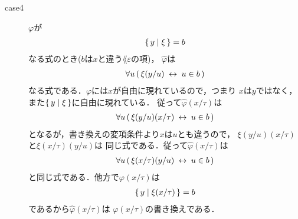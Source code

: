 \begin{metaprf}[第一]
\begin{description}
\begin{description}
					\item[case4] $\varphi$が
						\begin{align}
							\{\, y \mid \xi\, \} = b
						\end{align}
						なる式のとき($b$は$x$と違う$\lang{\varepsilon}$の項)，
						$\widehat{\varphi}$は
						\begin{align}
							\forall u\, (\, \xi(y/u) \hspace{0.25em}\leftrightarrow\hspace{0.25em} u \in b\, )
						\end{align}
						なる式である．$\varphi$には$x$が自由に現れているので，つまり
						$x$は$y$ではなく，また$\{\, y \mid \xi\, \}$に自由に現れている．
						従って$\widehat{\varphi}(x/\tau)$は
						\begin{align}
							\forall u\, (\, \xi(y/u)(x/\tau) \hspace{0.25em}\leftrightarrow\hspace{0.25em} u \in b\, )
						\end{align}
						となるが，書き換えの変項条件より$x$は$u$とも違うので，
						$\xi(y/u)(x/\tau)$と$\xi(x/\tau)(y/u)$は
						同じ式である．従って$\widehat{\varphi}(x/\tau)$は
						\begin{align}
							\forall u\, (\, \xi(x/\tau)(y/u) \hspace{0.25em}\leftrightarrow\hspace{0.25em} u \in b\, )
						\end{align}
						と同じ式である．他方で$\varphi(x/\tau)$は
						\begin{align}
							\{\, y \mid \xi(x/\tau)\, \} = b
						\end{align}
						であるから$\widehat{\varphi}(x/\tau)$は
						$\varphi(x/\tau)$の書き換えである．
					

\end{description}
\end{description}
\end{metaprf}
